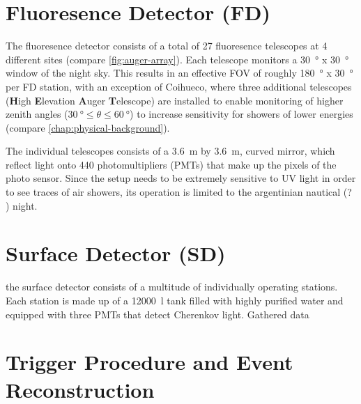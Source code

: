 \section{Fluoresence Detector (FD)}
\label{sec:fluoresence-detector}

The fluoresence detector consists of a total of 27 fluoresence telescopes at 4 different sites (compare \autoref{fig:auger-array}). Each telescope
monitors a \SI{30}{\degree} x \SI{30}{\degree} window of the night sky. This results in an effective FOV of roughly \SI{180}{\degree} x 
\SI{30}{\degree} per FD station, with an exception of Coihueco, where three additional telescopes (\textbf{H}igh \textbf{E}levation \textbf{A}uger
\textbf{T}elescope) are installed to enable monitoring of higher zenith angles ($\SI{30}{\degree}\leq\theta\leq\SI{60}{\degree}$) to increase
sensitivity for showers of lower energies (compare \autoref{chap:physical-background}).

The individual telescopes consists of a \SI{3.6}{\meter} by \SI{3.6}{\meter}, curved mirror, which reflect light onto 440 photomultipliers (PMTs)
that make up the pixels of the photo sensor. Since the setup needs to be extremely sensitive to UV light in order to see traces of air showers, 
its operation is limited to the argentinian nautical (? \TODO) night.

\section{Surface Detector (SD)}
\label{sec:surface-detector}

the surface detector consists of a multitude of individually operating stations. Each station is made up of a \SI{12000}{\litre} tank filled with 
highly purified water and equipped with three PMTs that detect Cherenkov light. Gathered data  

\section{Trigger Procedure and Event Reconstruction}
\label{sec:event-reconstruction}


